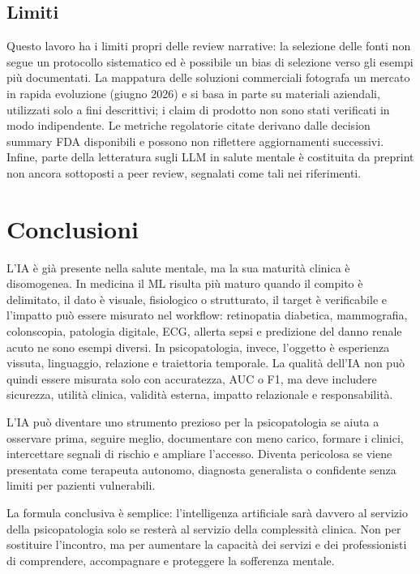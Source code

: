 \documentclass[11pt,a4paper]{article}
\begin{document}
\subsection{Limiti}
\label{sec:limiti}

Questo lavoro ha i limiti propri delle review narrative: la selezione delle fonti non segue un protocollo sistematico ed è possibile un bias di selezione verso gli esempi più documentati. La mappatura delle soluzioni commerciali fotografa un mercato in rapida evoluzione (giugno 2026) e si basa in parte su materiali aziendali, utilizzati solo a fini descrittivi; i claim di prodotto non sono stati verificati in modo indipendente. Le metriche regolatorie citate derivano dalle decision summary FDA disponibili e possono non riflettere aggiornamenti successivi. Infine, parte della letteratura sugli LLM in salute mentale è costituita da preprint non ancora sottoposti a peer review, segnalati come tali nei riferimenti.

\section{Conclusioni}
\label{sec:conclusioni}

L'IA è già presente nella salute mentale, ma la sua maturità clinica è disomogenea. In medicina il ML risulta più maturo quando il compito è delimitato, il dato è visuale, fisiologico o strutturato, il target è verificabile e l'impatto può essere misurato nel workflow: retinopatia diabetica, mammografia, colonscopia, patologia digitale, ECG, allerta sepsi e predizione del danno renale acuto ne sono esempi diversi. In psicopatologia, invece, l'oggetto è esperienza vissuta, linguaggio, relazione e traiettoria temporale. La qualità dell'IA non può quindi essere misurata solo con accuratezza, AUC o F1, ma deve includere sicurezza, utilità clinica, validità esterna, impatto relazionale e responsabilità.

L'IA può diventare uno strumento prezioso per la psicopatologia se aiuta a osservare prima, seguire meglio, documentare con meno carico, formare i clinici, intercettare segnali di rischio e ampliare l'accesso. Diventa pericolosa se viene presentata come terapeuta autonomo, diagnosta generalista o confidente senza limiti per pazienti vulnerabili.

La formula conclusiva è semplice: l'intelligenza artificiale sarà davvero al servizio della psicopatologia solo se resterà al servizio della complessità clinica. Non per sostituire l'incontro, ma per aumentare la capacità dei servizi e dei professionisti di comprendere, accompagnare e proteggere la sofferenza mentale.
\end{document}
